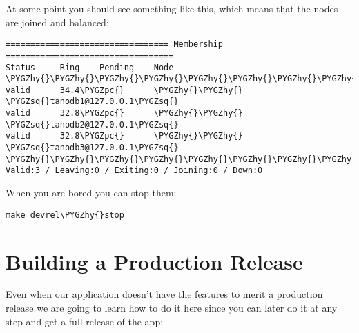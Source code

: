 \documentclass[letterpaper,10pt,english]{sphinxmanual}
\def\PYGZpc{\char`\%}
\def\PYGZhy{\char`\-}
\def\PYGZsq{\char`\'}
\renewcommand\PYGZsq{\textquotesingle}
\begin{document}
At some point you should see something like this, which means that the nodes
are joined and balanced:

\begin{Verbatim}[commandchars=\\\{\}]
================================= Membership ==================================
Status     Ring    Pending    Node
\PYGZhy{}\PYGZhy{}\PYGZhy{}\PYGZhy{}\PYGZhy{}\PYGZhy{}\PYGZhy{}\PYGZhy{}\PYGZhy{}\PYGZhy{}\PYGZhy{}\PYGZhy{}\PYGZhy{}\PYGZhy{}\PYGZhy{}\PYGZhy{}\PYGZhy{}\PYGZhy{}\PYGZhy{}\PYGZhy{}\PYGZhy{}\PYGZhy{}\PYGZhy{}\PYGZhy{}\PYGZhy{}\PYGZhy{}\PYGZhy{}\PYGZhy{}\PYGZhy{}\PYGZhy{}\PYGZhy{}\PYGZhy{}\PYGZhy{}\PYGZhy{}\PYGZhy{}\PYGZhy{}\PYGZhy{}\PYGZhy{}\PYGZhy{}\PYGZhy{}\PYGZhy{}\PYGZhy{}\PYGZhy{}\PYGZhy{}\PYGZhy{}\PYGZhy{}\PYGZhy{}\PYGZhy{}\PYGZhy{}\PYGZhy{}\PYGZhy{}\PYGZhy{}\PYGZhy{}\PYGZhy{}\PYGZhy{}\PYGZhy{}\PYGZhy{}\PYGZhy{}\PYGZhy{}\PYGZhy{}\PYGZhy{}\PYGZhy{}\PYGZhy{}\PYGZhy{}\PYGZhy{}\PYGZhy{}\PYGZhy{}\PYGZhy{}\PYGZhy{}\PYGZhy{}\PYGZhy{}\PYGZhy{}\PYGZhy{}\PYGZhy{}\PYGZhy{}\PYGZhy{}\PYGZhy{}\PYGZhy{}\PYGZhy{}
valid      34.4\PYGZpc{}      \PYGZhy{}\PYGZhy{}      \PYGZsq{}tanodb1@127.0.0.1\PYGZsq{}
valid      32.8\PYGZpc{}      \PYGZhy{}\PYGZhy{}      \PYGZsq{}tanodb2@127.0.0.1\PYGZsq{}
valid      32.8\PYGZpc{}      \PYGZhy{}\PYGZhy{}      \PYGZsq{}tanodb3@127.0.0.1\PYGZsq{}
\PYGZhy{}\PYGZhy{}\PYGZhy{}\PYGZhy{}\PYGZhy{}\PYGZhy{}\PYGZhy{}\PYGZhy{}\PYGZhy{}\PYGZhy{}\PYGZhy{}\PYGZhy{}\PYGZhy{}\PYGZhy{}\PYGZhy{}\PYGZhy{}\PYGZhy{}\PYGZhy{}\PYGZhy{}\PYGZhy{}\PYGZhy{}\PYGZhy{}\PYGZhy{}\PYGZhy{}\PYGZhy{}\PYGZhy{}\PYGZhy{}\PYGZhy{}\PYGZhy{}\PYGZhy{}\PYGZhy{}\PYGZhy{}\PYGZhy{}\PYGZhy{}\PYGZhy{}\PYGZhy{}\PYGZhy{}\PYGZhy{}\PYGZhy{}\PYGZhy{}\PYGZhy{}\PYGZhy{}\PYGZhy{}\PYGZhy{}\PYGZhy{}\PYGZhy{}\PYGZhy{}\PYGZhy{}\PYGZhy{}\PYGZhy{}\PYGZhy{}\PYGZhy{}\PYGZhy{}\PYGZhy{}\PYGZhy{}\PYGZhy{}\PYGZhy{}\PYGZhy{}\PYGZhy{}\PYGZhy{}\PYGZhy{}\PYGZhy{}\PYGZhy{}\PYGZhy{}\PYGZhy{}\PYGZhy{}\PYGZhy{}\PYGZhy{}\PYGZhy{}\PYGZhy{}\PYGZhy{}\PYGZhy{}\PYGZhy{}\PYGZhy{}\PYGZhy{}\PYGZhy{}\PYGZhy{}\PYGZhy{}\PYGZhy{}
Valid:3 / Leaving:0 / Exiting:0 / Joining:0 / Down:0
\end{Verbatim}

When you are bored you can stop them:

\begin{Verbatim}[commandchars=\\\{\}]
make devrel\PYGZhy{}stop
\end{Verbatim}


\section{Building a Production Release}
\label{starting:building-a-production-release}
Even when our application doesn't have the features to merit a production
release we are going to learn how to do it here since you can later do it at
any step and get a full release of the app:
\end{document}
